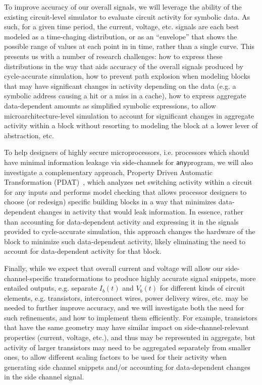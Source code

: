 To improve accuracy of our overall signals, we will leverage the ability of the existing circuit-level simulator to evaluate circuit activity for symbolic data.  As such, for a given time period, the current, voltage, etc. signals are each best modeled as a time-chaging distribution, or as an  ``envelope'' that shows the possible range of values at each point in in time, rather than a single curve. This presents us with a number of research challenges: how to express these distributions in the way that aids accuracy of the overall signals produced by cycle-accurate simulation, how to prevent path explosion when modeling blocks that may have significant changes in activity depending on the data (e.g. a symbolic address causing a hit or a miss in a cache), how to express aggregate data-dependent amounts as simplified symbolic expressions, to allow microarchitecture-level simulation to account for significant changes in aggregate activity within a block without resorting to modeling the block at a lower lever of abstraction, etc.

To help designers of highly secure microprocessors, i.e. processors which should have minimal information leakage via side-channels for {\tt any}program, we will also investigate a complementary approach, Property Driven Automatic Transformation (PDAT)~\cite{bleier21}, which analyzes net switching activity within a circuit for any inputs and performs model checking that allows processor designers to choose (or redesign) specific building blocks in a way that minimizes data-dependent changes in activity that would leak information. In essence, rather than accounting for data-dependent activity and expressing it in the signals provided to cycle-accurate simulation, this approach changes the hardware of the block to minimize such data-dependent activity, likely eliminating the need to account for data-dependent activity for that block.

Finally, while we expect that overall current and voltage will allow our side-channel-specific transformations to produce highly accurate signal snippets, more entailed outputs, e.g. separate $I_b(t)$ and $V_b(t)$ for different kinds of circuit elements, e.g. transistors, interconnect wires, power delivery wires, etc. may be needed to further improve accuracy, and we will investigate both the need for such refinements, and how to implement them efficiently. For example, transistors that have the same geometry may have similar impact on side-channel-relevant properties (current, voltage, etc.), and thus may be represented in aggregate, but activity of larger transistors may need to be aggregated separately from smaller ones, to allow different scaling factors to be used for their activity when generating side channel snippets and/or accounting for data-dependent changes in the side channel signal.

